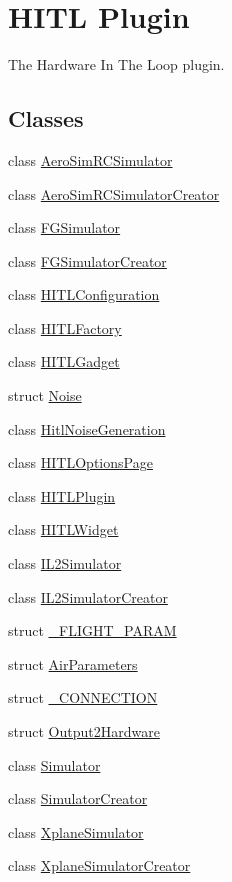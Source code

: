 \hypertarget{group___h_i_t_l_plugin}{\section{\-H\-I\-T\-L \-Plugin}
\label{group___h_i_t_l_plugin}
}


\-The \-Hardware \-In \-The \-Loop plugin.  


\subsection*{\-Classes}
\begin{DoxyCompactItemize}
\item 
class \hyperlink{class_aero_sim_r_c_simulator}{\-Aero\-Sim\-R\-C\-Simulator}
\item 
class \hyperlink{class_aero_sim_r_c_simulator_creator}{\-Aero\-Sim\-R\-C\-Simulator\-Creator}
\item 
class \hyperlink{class_f_g_simulator}{\-F\-G\-Simulator}
\item 
class \hyperlink{class_f_g_simulator_creator}{\-F\-G\-Simulator\-Creator}
\item 
class \hyperlink{class_h_i_t_l_configuration}{\-H\-I\-T\-L\-Configuration}
\item 
class \hyperlink{class_h_i_t_l_factory}{\-H\-I\-T\-L\-Factory}
\item 
class \hyperlink{class_h_i_t_l_gadget}{\-H\-I\-T\-L\-Gadget}
\item 
struct \hyperlink{struct_noise}{\-Noise}
\item 
class \hyperlink{class_hitl_noise_generation}{\-Hitl\-Noise\-Generation}
\item 
class \hyperlink{class_h_i_t_l_options_page}{\-H\-I\-T\-L\-Options\-Page}
\item 
class \hyperlink{class_h_i_t_l_plugin}{\-H\-I\-T\-L\-Plugin}
\item 
class \hyperlink{class_h_i_t_l_widget}{\-H\-I\-T\-L\-Widget}
\item 
class \hyperlink{class_i_l2_simulator}{\-I\-L2\-Simulator}
\item 
class \hyperlink{class_i_l2_simulator_creator}{\-I\-L2\-Simulator\-Creator}
\item 
struct \hyperlink{struct___f_l_i_g_h_t___p_a_r_a_m}{\-\_\-\-F\-L\-I\-G\-H\-T\-\_\-\-P\-A\-R\-A\-M}
\item 
struct \hyperlink{struct_air_parameters}{\-Air\-Parameters}
\item 
struct \hyperlink{struct___c_o_n_n_e_c_t_i_o_n}{\-\_\-\-C\-O\-N\-N\-E\-C\-T\-I\-O\-N}
\item 
struct \hyperlink{struct_output2_hardware}{\-Output2\-Hardware}
\item 
class \hyperlink{class_simulator}{\-Simulator}
\item 
class \hyperlink{class_simulator_creator}{\-Simulator\-Creator}
\item 
class \hyperlink{class_xplane_simulator}{\-Xplane\-Simulator}
\item 
class \hyperlink{class_xplane_simulator_creator}{\-Xplane\-Simulator\-Creator}
\end{DoxyCompactItemize}
